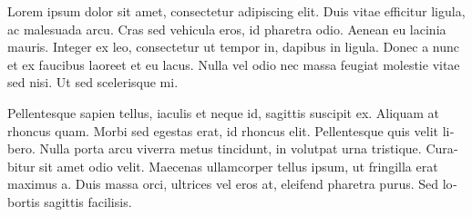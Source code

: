\begin{otherlanguage}{swedish}
Lorem ipsum dolor sit amet, consectetur adipiscing elit. Duis vitae efficitur ligula, ac malesuada arcu. Cras sed vehicula eros, id pharetra odio. Aenean eu lacinia mauris. Integer ex leo, consectetur ut tempor in, dapibus in ligula. Donec a nunc et ex faucibus laoreet et eu lacus. Nulla vel odio nec massa feugiat molestie vitae sed nisi. Ut sed scelerisque mi.

Pellentesque sapien tellus, iaculis et neque id, sagittis suscipit ex. Aliquam at rhoncus quam. Morbi sed egestas erat, id rhoncus elit. Pellentesque quis velit libero. Nulla porta arcu viverra metus tincidunt, in volutpat urna tristique. Curabitur sit amet odio velit. Maecenas ullamcorper tellus ipsum, ut fringilla erat maximus a. Duis massa orci, ultrices vel eros at, eleifend pharetra purus. Sed lobortis sagittis facilisis.

\end{otherlanguage}
